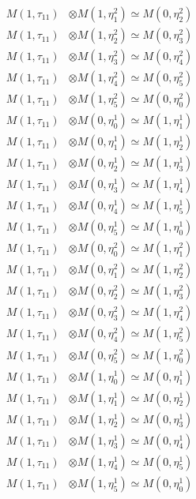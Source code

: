\begin{align*}
M(1,\tau_{11}) &\otimes M(1,\eta^{2}_{1}) \simeq M(0,\eta^{2}_{2}) \\
M(1,\tau_{11}) &\otimes M(1,\eta^{2}_{2}) \simeq M(0,\eta^{2}_{3}) \\
M(1,\tau_{11}) &\otimes M(1,\eta^{2}_{3}) \simeq M(0,\eta^{2}_{4}) \\
M(1,\tau_{11}) &\otimes M(1,\eta^{2}_{4}) \simeq M(0,\eta^{2}_{5}) \\
M(1,\tau_{11}) &\otimes M(1,\eta^{2}_{5}) \simeq M(0,\eta^{2}_{0}) \\
M(1,\tau_{11}) &\otimes M(0,\eta^{1}_{0}) \simeq M(1,\eta^{1}_{1}) \\
M(1,\tau_{11}) &\otimes M(0,\eta^{1}_{1}) \simeq M(1,\eta^{1}_{2}) \\
M(1,\tau_{11}) &\otimes M(0,\eta^{1}_{2}) \simeq M(1,\eta^{1}_{3}) \\
M(1,\tau_{11}) &\otimes M(0,\eta^{1}_{3}) \simeq M(1,\eta^{1}_{4}) \\
M(1,\tau_{11}) &\otimes M(0,\eta^{1}_{4}) \simeq M(1,\eta^{1}_{5}) \\
M(1,\tau_{11}) &\otimes M(0,\eta^{1}_{5}) \simeq M(1,\eta^{1}_{0}) \\
M(1,\tau_{11}) &\otimes M(0,\eta^{2}_{0}) \simeq M(1,\eta^{2}_{1}) \\
M(1,\tau_{11}) &\otimes M(0,\eta^{2}_{1}) \simeq M(1,\eta^{2}_{2}) \\
M(1,\tau_{11}) &\otimes M(0,\eta^{2}_{2}) \simeq M(1,\eta^{2}_{3}) \\
M(1,\tau_{11}) &\otimes M(0,\eta^{2}_{3}) \simeq M(1,\eta^{2}_{4}) \\
M(1,\tau_{11}) &\otimes M(0,\eta^{2}_{4}) \simeq M(1,\eta^{2}_{5}) \\
M(1,\tau_{11}) &\otimes M(0,\eta^{2}_{5}) \simeq M(1,\eta^{2}_{0}) \\
M(1,\tau_{11}) &\otimes M(1,\eta^{1}_{0}) \simeq M(0,\eta^{1}_{1}) \\
M(1,\tau_{11}) &\otimes M(1,\eta^{1}_{1}) \simeq M(0,\eta^{1}_{2}) \\
M(1,\tau_{11}) &\otimes M(1,\eta^{1}_{2}) \simeq M(0,\eta^{1}_{3}) \\
M(1,\tau_{11}) &\otimes M(1,\eta^{1}_{3}) \simeq M(0,\eta^{1}_{4}) \\
M(1,\tau_{11}) &\otimes M(1,\eta^{1}_{4}) \simeq M(0,\eta^{1}_{5}) \\
M(1,\tau_{11}) &\otimes M(1,\eta^{1}_{5}) \simeq M(0,\eta^{1}_{0}) \\
\end{align*}

